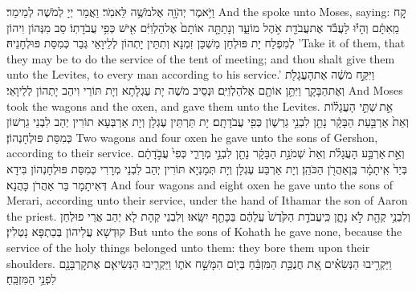 {וַיֹּ֥אמֶר יְהֹוָ֖ה אֶל\maqqaf מֹשֶׁ֥ה לֵּאמֹֽר׃}
{וַאֲמַר יְיָ לְמֹשֶׁה לְמֵימַר׃}
{And the \lord\space spoke unto Moses, saying:}{}
{קַ֚ח מֵֽאִתָּ֔ם וְהָי֕וּ לַעֲבֹ֕ד אֶת\maqqaf עֲבֹדַ֖ת אֹ֣הֶל מוֹעֵ֑ד וְנָתַתָּ֤ה אוֹתָם֙ אֶל\maqqaf הַלְוִיִּ֔ם אִ֖ישׁ כְּפִ֥י עֲבֹדָתֽוֹ׃}
{סַב מִנְּהוֹן וִיהוֹן לְמִפְלַח יָת פּוּלְחַן מַשְׁכַּן זִמְנָא וְתִתֵּין יָתְהוֹן לְלֵיוָאֵי גְּבַר כְּמִסַּת פּוּלְחָנֵיהּ׃}
{’Take it of them, that they may be to do the service of the tent of meeting; and thou shalt give them unto the Levites, to every man according to his service.’}{}
{וַיִּקַּ֣ח מֹשֶׁ֔ה אֶת\maqqaf הָעֲגָלֹ֖ת וְאֶת\maqqaf הַבָּקָ֑ר וַיִּתֵּ֥ן אוֹתָ֖ם אֶל\maqqaf הַלְוִיִּֽם׃}
{וּנְסֵיב מֹשֶׁה יָת עֶגְלָתָא וְיָת תּוֹרֵי וִיהַב יָתְהוֹן לְלֵיוָאֵי׃}
{And Moses took the wagons and the oxen, and gave them unto the Levites.}{}
{אֵ֣ת \legarmeh  שְׁתֵּ֣י הָעֲגָל֗וֹת וְאֵת֙ אַרְבַּ֣עַת הַבָּקָ֔ר נָתַ֖ן לִבְנֵ֣י גֵרְשׁ֑וֹן כְּפִ֖י עֲבֹדָתָֽם׃}
{יָת תַּרְתֵּין עֶגְלָן וְיָת אַרְבְּעָא תוֹרִין יְהַב לִבְנֵי גֵרְשׁוֹן כְּמִסַּת פּוּלְחָנְהוֹן׃}
{Two wagons and four oxen he gave unto the sons of Gershon, according to their service.}{}
{וְאֵ֣ת \legarmeh  אַרְבַּ֣ע הָעֲגָלֹ֗ת וְאֵת֙ שְׁמֹנַ֣ת הַבָּקָ֔ר נָתַ֖ן לִבְנֵ֣י מְרָרִ֑י כְּפִי֙ עֲבֹ֣דָתָ֔ם בְּיַד֙ אִֽיתָמָ֔ר בֶּֽן\maqqaf אַהֲרֹ֖ן הַכֹּהֵֽן׃}
{וְיָת אַרְבַּע עֶגְלָן וְיָת תְּמָנְיָא תּוֹרִין יְהַב לִבְנֵי מְרָרִי כְּמִסַּת פּוּלְחָנְהוֹן בִּידָא דְּאִיתָמָר בַּר אַהֲרֹן כָּהֲנָא׃}
{And four wagons and eight oxen he gave unto the sons of Merari, according unto their service, under the hand of Ithamar the son of Aaron the priest.}{}
{וְלִבְנֵ֥י קְהָ֖ת לֹ֣א נָתָ֑ן כִּֽי\maqqaf עֲבֹדַ֤ת הַקֹּ֙דֶשׁ֙ עֲלֵהֶ֔ם בַּכָּתֵ֖ף יִשָּֽׂאוּ׃}
{וְלִבְנֵי קְהָת לָא יְהַב אֲרֵי פוּלְחַן קוּדְשָׁא עֲלֵיהוֹן בְּכַתְפָּא נָטְלִין׃}
{But unto the sons of Kohath he gave none, because the service of the holy things belonged unto them: they bore them upon their shoulders.}{}
{וַיַּקְרִ֣יבוּ הַנְּשִׂאִ֗ים אֵ֚ת חֲנֻכַּ֣ת הַמִּזְבֵּ֔חַ בְּי֖וֹם הִמָּשַׁ֣ח אֹת֑וֹ וַיַּקְרִ֧יבוּ הַנְּשִׂיאִ֛ם אֶת\maqqaf קׇרְבָּנָ֖ם לִפְנֵ֥י הַמִּזְבֵּֽחַ׃}
